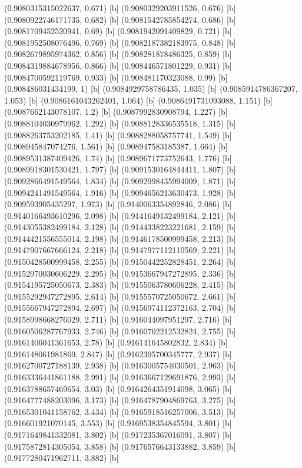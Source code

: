 {{{(0.9080315315022637, 0.671) [b] 
(0.9080329203911526, 0.676) [b] 
(0.9080922746171735, 0.682) [b] 
(0.9081542785854274, 0.686) [b] 
(0.9081709452520941, 0.69) [b] 
(0.9081942091409829, 0.721) [b] 
(0.9081952508076496, 0.769) [b] 
(0.9082187382183975, 0.848) [b] 
(0.9082679895974362, 0.856) [b] 
(0.908281878486325, 0.859) [b] 
(0.9084319884678956, 0.866) [b] 
(0.908446571801229, 0.931) [b] 
(0.9084700592119769, 0.933) [b] 
(0.908481170323088, 0.99) [b] 
(0.908486031434199, 1) [b] 
(0.9084929758786435, 1.035) [b] 
(0.9085914786367207, 1.053) [b] 
(0.9086161043262401, 1.064) [b] 
(0.9086491731093088, 1.151) [b] 
(0.9087662143078107, 1.2) [b] 
(0.9087992830908794, 1.227) [b] 
(0.9088104030979962, 1.292) [b] 
(0.9088128336535518, 1.315) [b] 
(0.9088263753202185, 1.41) [b] 
(0.9088288058757741, 1.549) [b] 
(0.908945847074276, 1.561) [b] 
(0.908947583185387, 1.664) [b] 
(0.9089531387409426, 1.74) [b] 
(0.9089671773752643, 1.776) [b] 
(0.9089918301530421, 1.797) [b] 
(0.9091530164844411, 1.807) [b] 
(0.9092866491549564, 1.834) [b] 
(0.9092998435994009, 1.871) [b] 
(0.9094241491549564, 1.916) [b] 
(0.9094656213630473, 1.928) [b] 
(0.909593905435297, 1.973) [b] 
(0.9140063354892846, 2.086) [b] 
(0.9140166493610296, 2.098) [b] 
(0.9141649132499184, 2.121) [b] 
(0.9143055382499184, 2.128) [b] 
(0.9144338223221681, 2.159) [b] 
(0.9144421556555014, 2.198) [b] 
(0.9146178500999458, 2.213) [b] 
(0.9147907667666124, 2.218) [b] 
(0.9147977112110569, 2.221) [b] 
(0.9150428500999458, 2.255) [b] 
(0.9150442252828451, 2.264) [b] 
(0.9152970030606229, 2.295) [b] 
(0.9153667947272895, 2.336) [b] 
(0.9154195725050673, 2.383) [b] 
(0.9155063780606228, 2.415) [b] 
(0.9155292947272895, 2.614) [b] 
(0.9155570725050672, 2.661) [b] 
(0.9155667947272894, 2.697) [b] 
(0.9156974112372163, 2.704) [b] 
(0.9158998668276029, 2.711) [b] 
(0.916044097951297, 2.716) [b] 
(0.9160506287767933, 2.746) [b] 
(0.9160702212532824, 2.755) [b] 
(0.9161406041361653, 2.78) [b] 
(0.916141645802832, 2.834) [b] 
(0.916148061981869, 2.847) [b] 
(0.9162395700345777, 2.937) [b] 
(0.9162700727188139, 2.938) [b] 
(0.9163005754030501, 2.963) [b] 
(0.9163336441861188, 2.991) [b] 
(0.9163667129691876, 2.993) [b] 
(0.9163788657469654, 3.03) [b] 
(0.9164264351914098, 3.065) [b] 
(0.9164777488203096, 3.173) [b] 
(0.9164787904869763, 3.275) [b] 
(0.9165301041158762, 3.434) [b] 
(0.9165918516257006, 3.513) [b] 
(0.916601921070145, 3.553) [b] 
(0.9169538354845594, 3.801) [b] 
(0.9171649841332081, 3.802) [b] 
(0.917235367016091, 3.807) [b] 
(0.9175872814305054, 3.858) [b] 
(0.9176576643133882, 3.859) [b] 
(0.9177280471962711, 3.882) [b] 
}}}
